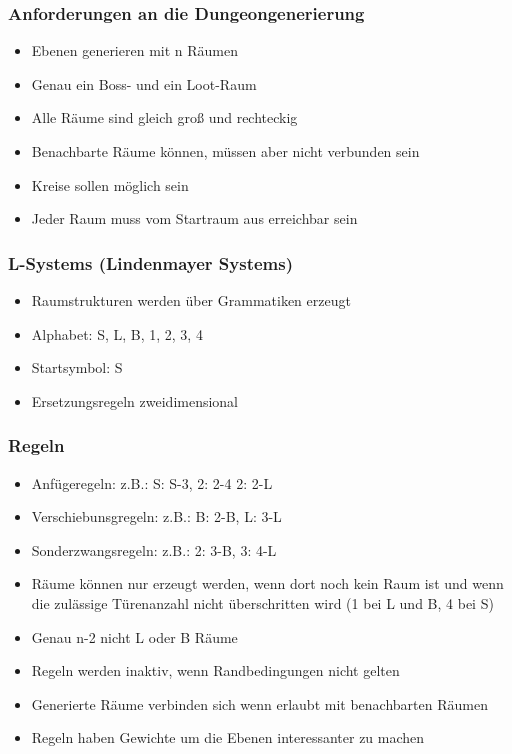 \begin{frame}
\frametitle{Anforderungen an die Dungeongenerierung}

\begin{itemize}
\item Ebenen generieren mit n Räumen
\item Genau ein Boss- und ein Loot-Raum
\item Alle Räume sind gleich groß und rechteckig
\item Benachbarte Räume können, müssen aber nicht verbunden sein
\item Kreise sollen möglich sein
\item Jeder Raum muss vom Startraum aus erreichbar sein
\end{itemize}

\end{frame}

\begin{frame}
\frametitle{L-Systems (Lindenmayer Systems)}

\begin{itemize}
\item Raumstrukturen werden über Grammatiken erzeugt
\item Alphabet: S, L, B, 1, 2, 3, 4
\item Startsymbol: S
\item Ersetzungsregeln zweidimensional
\end{itemize}

\end{frame}

\begin{frame}
\frametitle{Regeln}

\begin{itemize}
\item Anfügeregeln: z.B.: S: S-3, 2: 2-4 2: 2-L
\item Verschiebunsgregeln: z.B.: B: 2-B, L: 3-L
\item Sonderzwangsregeln: z.B.: 2: 3-B, 3: 4-L
\item Räume können nur erzeugt werden, wenn dort noch kein Raum ist und wenn die zulässige Türenanzahl nicht überschritten wird (1 bei L und B, 4 bei S)
\item Genau n-2 nicht L oder B Räume
\item Regeln werden inaktiv, wenn Randbedingungen nicht gelten
\item Generierte Räume verbinden sich wenn erlaubt mit benachbarten Räumen
\item Regeln haben Gewichte um die Ebenen interessanter zu machen
\end{itemize}

\end{frame}

